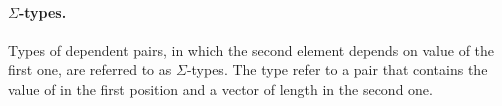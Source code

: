 \begin{figure}
\end{figure}


\paragraph{$\Sigma$-types.}
Types of dependent pairs, in which the second element depends on value of the first one, are referred to as $\Sigma$-types. The type 
refer to a pair that contains the value of  in the first position and a vector of length  in the second one. 

